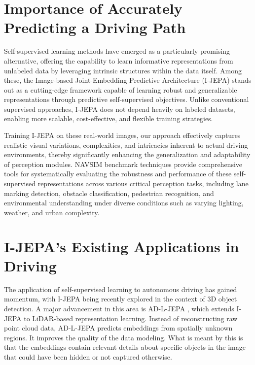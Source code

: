 \documentclass{article}
\begin{document}
\label{sec:related}

\section{Importance of Accurately Predicting a Driving Path}
\label{sec:Importance}

Self-supervised learning methods have emerged as a particularly promising alternative, offering the capability to learn informative representations from unlabeled data by leveraging intrinsic structures within the data itself. Among these, the Image-based Joint-Embedding Predictive Architecture (I-JEPA) stands out as a cutting-edge framework capable of learning robust and generalizable representations through predictive self-supervised objectives. Unlike conventional supervised approaches, I-JEPA does not depend heavily on labeled datasets, enabling more scalable, cost-effective, and flexible training strategies.

Training I-JEPA on these real-world images, our approach effectively captures realistic visual variations, complexities, and intricacies inherent to actual driving environments, thereby significantly enhancing the generalization and adaptability of perception modules. NAVSIM benchmark techniques provide comprehensive tools for systematically evaluating the robustness and performance of these self-supervised representations across various critical perception tasks, including lane marking detection, obstacle classification, pedestrian recognition, and environmental understanding under diverse conditions such as varying lighting, weather, and urban complexity.

\section{I-JEPA’s Existing Applications in Driving}

The application of self-supervised learning to autonomous driving has gained momentum, with I-JEPA being recently explored in the context of 3D object detection. A major advancement in this area is AD-L-JEPA \citep{zhu2025ad}, which extends I-JEPA to LiDAR-based representation learning. Instead of reconstructing raw point cloud data, AD-L-JEPA predicts embeddings from spatially unknown regions. It improves the quality of the data modeling. What is meant by this is that the embeddings contain relevant details about specific objects in the image that could have been hidden or not captured otherwise. 
\end{document}
